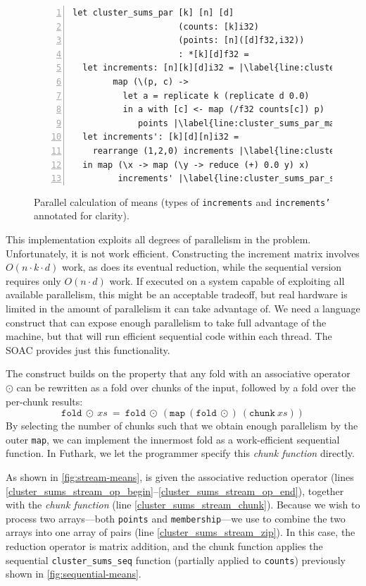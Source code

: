 \begin{figure}
\begin{lstlisting}[numbers=left,escapechar=|]
let cluster_sums_par [k] [n] [d]
                     (counts: [k]i32)
                     (points: [n]([d]f32,i32))
                     : *[k][d]f32 =
  let increments: [n][k][d]i32 = |\label{line:cluster_sums_par_map_begin}|
        map (\(p, c) ->
          let a = replicate k (replicate d 0.0)
          in a with [c] <- map (/f32 counts[c]) p)
             points |\label{line:cluster_sums_par_map_end}|
  let increments': [k][d][n]i32 =
    rearrange (1,2,0) increments |\label{line:cluster_sums_par_sum_begin}|
  in map (\x -> map (\y -> reduce (+) 0.0 y) x)
         increments' |\label{line:cluster_sums_par_sum_end}|
\end{lstlisting}
  \caption{Parallel calculation of means (types of \texttt{increments}
    and \texttt{increments'} annotated for clarity).}
\label{fig:parallel-means}
\end{figure}

This implementation exploits all degrees of parallelism in the
problem.  Unfortunately, it is not work efficient.  Constructing the
increment matrix involves
$O(n\cdot{}k\cdot{}d)$ work, as does its eventual reduction, while the
sequential version requires only
$O(n\cdot{}d)$ work.  If executed on a system capable of exploiting
all available parallelism, this might be an acceptable tradeoff, but
real hardware is limited in the amount of parallelism it can take
advantage of.  We need a language construct that can expose enough
parallelism to take full advantage of the machine, but that will run
efficient sequential code within each thread.  The \StreamRed{} SOAC
provides just this functionality.

The \StreamRed{} construct builds on the property that any fold
with an associative operator $\odot$ can be rewritten as a fold over
chunks of the input, followed by a fold over the per-chunk results:
\[
   \texttt{fold}\ \odot\ xs\ =\ \texttt{fold}\ \odot\ (\texttt{map}\ (\texttt{fold}\ \odot)\ (\texttt{chunk}\ xs))
\]
By selecting the number of chunks such that we obtain enough
parallelism by the outer \texttt{map}, we can implement the innermost
fold as a work-efficient sequential function.  In Futhark, we let the
programmer specify this \textit{chunk function} directly.

As shown in \cref{fig:stream-means}, \StreamRed{} is given the
associative reduction operator (lines
\ref{cluster_sums_stream_op_begin}--\ref{cluster_sums_stream_op_end}),
together with the \textit{chunk function} (line
\ref{cluster_sums_stream_chunk}).  Because we wish to process two
arrays---both \texttt{points} and \texttt{membership}---we use
 to combine the two arrays into one array of pairs (line
\ref{cluster_sums_stream_zip}).  In this case, the reduction operator
is matrix addition, and the chunk function applies the sequential
\lstinline{cluster_sums_seq} function (partially applied to
\lstinline{counts}) previously shown in \cref{fig:sequential-means}.


